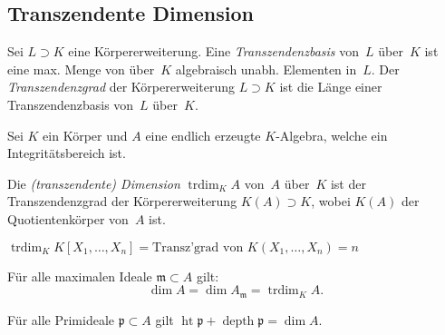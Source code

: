 \documentclass{cheat-sheet}
\DeclareMathOperator{\height}{ht} %
\DeclareMathOperator{\depth}{depth} %
\DeclareMathOperator{\trdim}{trdim} %
\newcommand{\ppp}{\mathfrak{p}}
\newcommand{\mmm}{\mathfrak{m}}
\begin{document}
\subsection{Transzendente Dimension}


\begin{defn}
  Sei $L \supset K$ eine Körpererweiterung.
  Eine \emph{Transzendenzbasis} von~$L$ über~$K$ ist eine max. Menge von über~$K$ algebraisch unabh. Elementen in~$L$.
  Der \emph{Transzendenzgrad} der Körpererweiterung $L \supset K$ ist die Länge einer Transzendenzbasis von~$L$ über~$K$.
\end{defn}

\begin{situation}
  Sei $K$ ein Körper und $A$ eine endlich erzeugte $K$-Algebra, welche ein Integritätsbereich ist.
\end{situation}

\begin{defn}
  Die \emph{(transzendente) Dimension} $\trdim_K A$ von~$A$ über~$K$ ist der Transzendenzgrad der Körpererweiterung $K(A) \supset K$, wobei $K(A)$ der Quotientenkörper von~$A$ ist.
\end{defn}

\begin{bsp}
  $\trdim_K K [X_1, \ldots, X_n] = \text{Transz'grad von } K (X_1, \ldots, X_n) = n$
\end{bsp}

\begin{satz}
  Für alle maximalen Ideale $\mmm \subset A$ gilt:
  \[
    \dim A = \dim A_\mmm = \trdim_K A.
  \]
\end{satz}

\begin{satz}
  Für alle Primideale $\ppp \subset A$ gilt \enspace
  $\height \ppp + \depth \ppp = \dim A$.
\end{satz}
\end{document}
